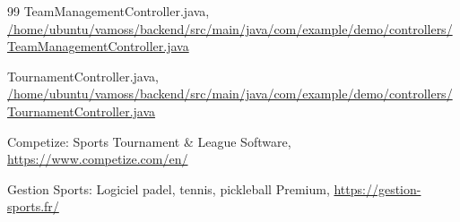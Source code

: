\documentclass{article}
\begin{document}
\begin{thebibliography}{99}
TeamManagementController.java, \url{/home/ubuntu/vamoss/backend/src/main/java/com/example/demo/controllers/TeamManagementController.java}

TournamentController.java, \url{/home/ubuntu/vamoss/backend/src/main/java/com/example/demo/controllers/TournamentController.java}

Competize: Sports Tournament & League Software, \url{https://www.competize.com/en/}

Gestion Sports: Logiciel padel, tennis, pickleball Premium, \url{https://gestion-sports.fr/}

\end{thebibliography}
\end{document}
